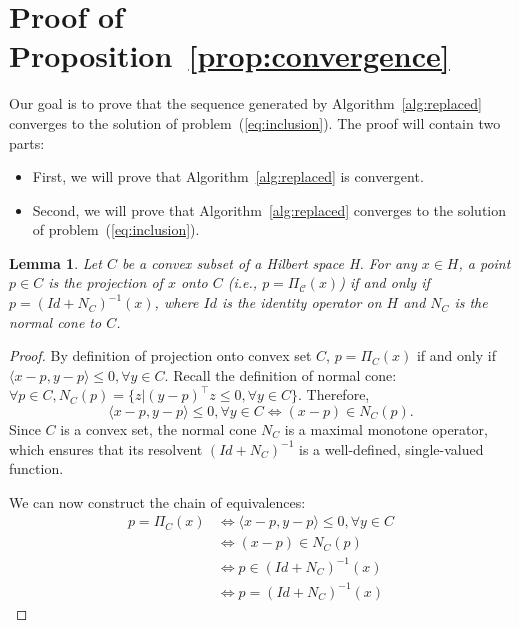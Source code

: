 \documentclass[10pt]{article} %
\newtheorem{lemma}[thm]{Lemma}
\begin{document}
\clearpage
\appendix
\section{Proof of Proposition~\ref{prop:convergence}}
\label{appendix:convergence}

Our goal is to prove that the sequence generated by Algorithm~\ref{alg:replaced} converges to the solution of problem~(\ref{eq:inclusion}).
The proof will contain two parts: 
\begin{itemize}
    \item First, we will prove that Algorithm~\ref{alg:replaced} is convergent.
    \item Second, we will prove that Algorithm~\ref{alg:replaced} converges to the solution of problem~(\ref{eq:inclusion}).
\end{itemize}


\begin{lemma}
\label{lem:proj}
Let $C$ be a convex subset of a Hilbert space H. For any $x\in H$, a point $p\in C$ is the projection of $x$ onto $C$ (i.e., $p=\Pi_\mathcal{C}(x)$) if and only if $p = (Id+N_C)^{-1}(x)$, where $Id$ is the identity operator on $H$ and $N_C$ is the normal cone to $C$.
\end{lemma}

\begin{proof}
By definition of projection onto convex set $C$, $p = \Pi_C(x)$ if and only if $\langle x-p, y-p\rangle \leq 0, \forall y\in C$.
Recall the definition of normal cone: $\forall p\in C, N_C(p) = \{z\vert (y-p)^\top z \leq 0, \forall y\in C\}$.
Therefore, 
$$\langle x-p, y-p\rangle \leq 0, \forall y\in C \Leftrightarrow (x-p) \in N_C(p).$$
Since $C$ is a convex set, the normal cone $N_C$ is a maximal monotone operator, which ensures that its resolvent $(Id+N_C)^{-1}$ is a well-defined, single-valued function.

We can now construct the chain of equivalences:
$$
\begin{aligned}
p = \Pi_C(x) &\Leftrightarrow \langle x-p, y-p\rangle \leq 0, \forall y\in C \\
&\Leftrightarrow (x-p) \in N_C(p) \\
&\Leftrightarrow p\in (Id + N_C)^{-1}(x) \\
&\Leftrightarrow p= (Id + N_C)^{-1}(x)
\end{aligned}
$$
\end{proof}
\end{document}
